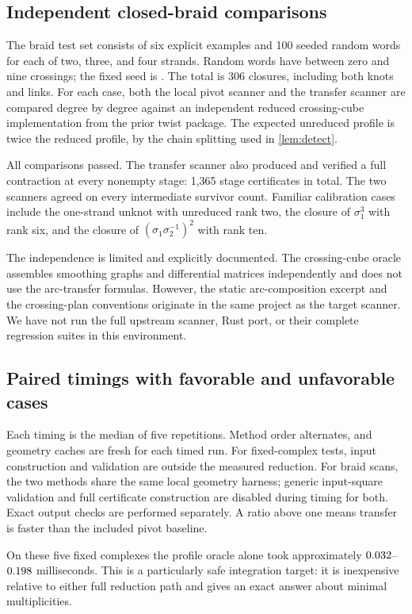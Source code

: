 \documentclass[11pt,letterpaper]{article}
\theoremstyle{definition}
\theoremstyle{remark}
\newcommand{\code}[1]{\texttt{\detokenize{#1}}}
\begin{document}
\subsection{Independent closed-braid comparisons}
The braid test set consists of six explicit examples and 100 seeded random
words for each of two, three, and four strands. Random words have between
zero and nine crossings; the fixed seed is \code{202610072}. The total is
306 closures, including both knots and links. For each case, both the local
pivot scanner and the transfer scanner are compared degree by degree against
an independent reduced crossing-cube implementation from the prior twist
package. The expected unreduced profile is twice the reduced profile, by the
chain splitting used in \cref{lem:detect}.

All comparisons passed. The transfer scanner also produced and verified a full
contraction at every nonempty stage: 1,365 stage certificates in total. The two
scanners agreed on every intermediate survivor count. Familiar calibration
cases include the one-strand unknot with unreduced rank two, the closure of
$\sigma_1^3$ with rank six, and the closure of
$(\sigma_1\sigma_2^{-1})^2$ with rank ten.

The independence is limited and explicitly documented. The crossing-cube
oracle assembles smoothing graphs and differential matrices independently and
does not use the arc-transfer formulas. However, the static arc-composition
excerpt and the crossing-plan conventions originate in the same project as
the target scanner. We have not run the full upstream scanner, Rust port, or
their complete regression suites in this environment.

\subsection{Paired timings with favorable and unfavorable cases}
Each timing is the median of five repetitions. Method order alternates, and
geometry caches are fresh for each timed run. For fixed-complex tests, input
construction and validation are outside the measured reduction. For braid
scans, the two methods share the same local geometry harness; generic
input-square validation and full certificate construction are disabled during
timing for both. Exact output checks are performed separately. A ratio above
one means transfer is faster than the included pivot baseline.


On these five fixed complexes the profile oracle alone took approximately
$0.032$--$0.198$ milliseconds. This is a particularly safe
integration target: it is inexpensive relative to either full reduction path
and gives an exact answer about minimal multiplicities.
\end{document}
